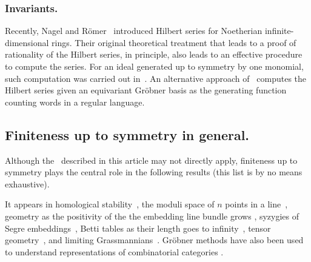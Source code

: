 \subsubsection{Invariants.}
Recently, Nagel and R\"omer~\cite{Nagel} introduced Hilbert series for Noetherian infinite-dimensional rings. Their original theoretical treatment that leads to a proof of rationality of the Hilbert series, in principle, also leads to an effective procedure to compute the series. For an ideal generated up to symmetry by one monomial, such computation was carried out in~\cite{gunturkun2016equivariant}. An alternative approach of~\cite{krone2016hilbert} computes the Hilbert series given an equivariant Gr\"obner basis as the generating function counting words in a regular language.  

\subsection{Finiteness up to symmetry in general.}
Although the \EGBs\ described in this article may not directly apply, finiteness up to symmetry plays the central role in the following results (this list is by no means exhaustive).  

It appears in homological stability~\cite{randal2013homological, church2012homological},  the moduli space of $n$ points in a line~\cite{howard2009equations}, geometry as the positivity of the the embedding line bundle grows \cite{ein2012asymptotic}, syzygies of Segre embeddings~\cite{snowden2013syzygies}, Betti tables as their length goes to infinity~\cite{ein2015asymptotics}, tensor geometry~\cite{draisma2014bounded, draisma2015finiteness}, and limiting Grassmannians~\cite{draisma2015plucker}.
Gr\"obner methods have also been used to understand representations of combinatorial categories \cite{sam2016grobner}.
